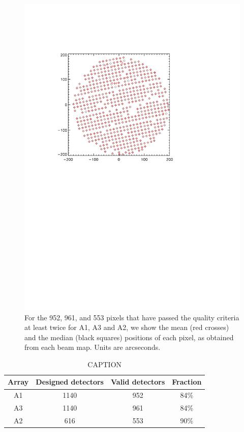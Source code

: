 \begin{figure}[htp]
\begin{center}
\includegraphics[trim=2cm 14cm 5cm 4cm, clip=true,width=0.6\linewidth]{Figures/A2_test_positions.pdf}
\caption{For the 952, 961, and 553 pixels that
  have passed the quality criteria at least twice for A1, A3 and A2,
  we show the mean (red crosses) and the median (black squares)
  positions of each pixel, as obtained from each beam map.
  Units are arcseconds. }
\label{fig:mean_vs_median}
\end{center}
\end{figure}


\begin{table}[ht]
\begin{center}  
  \begin{tabular}{|c|c|c|c|}
    \hline
    Array & Designed detectors &  Valid detectors & Fraction\\
    \hline\hline
    A1 & 1140 & 952 &  84\%\\
    A3 & 1140 & 961 &  84\%\\
    A2 & 616  & 553 &  90\%\\
    \hline
  \end{tabular}
  \caption{ CAPTION}
  \label{tab:number_of_kids}
\end{center}    
\end{table}
